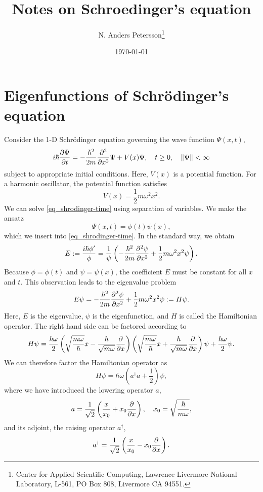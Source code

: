 \documentclass[11pt]{article}
\begin{document}
\title{Notes on Schroedinger's equation}

\author{N. Anders Petersson\thanks{Center for Applied
    Scientific Computing, Lawrence Livermore National Laboratory, L-561, PO Box 808, Livermore CA
    94551. }}

\date{\today}

\maketitle

\section{Eigenfunctions of Schr\"{o}dinger's equation}
 Consider the 1-D Schr\"odinger equation governing the wave function $\Psi(x,t)$,
\begin{equation}\label{eq_shrodinger-time}
i\hbar\frac{\partial \Psi}{\partial t} = -\frac{\hbar^2}{2 m} \frac{\partial^2}{\partial x^2} \Psi + V(x) \Psi,\quad t\geq
0,\quad \| \Psi \| < \infty
\end{equation}
subject to appropriate initial conditions. Here, $V(x)$ is a potential function. For a harmonic
oscillator, the potential function satisfies
\[
V(x) = \frac{1}{2}m\omega^2 x^2.
\]
We can solve \eqref{eq_shrodinger-time} using separation of variables. We make the ansatz
\[
\Psi(x,t) = \phi(t) \psi(x),
\]
which we insert into \eqref{eq_shrodinger-time}. In the standard way, we obtain
\[
E:= \frac{i\hbar \phi'}{\phi} = \frac{1}{\psi} \left(-\frac{\hbar^2}{2m} \frac{\partial^2\psi}{\partial x^2} +
\frac{1}{2} m \omega^2 x^2 \psi \right).
\]
Because $\phi=\phi(t)$ and $\psi=\psi(x)$, the coefficient $E$ must be constant for all $x$ and
$t$. This observation leads to the eigenvalue problem
\begin{equation}\label{eq_eigen-problem}
E\psi = -\frac{\hbar^2}{2m} \frac{\partial^2\psi}{\partial x^2} + \frac{1}{2} m \omega^2 x^2 \psi := H\psi.
\end{equation}
Here, $E$ is the eigenvalue, $\psi$ is the eigenfunction, and $H$ is called the Hamiltonian
operator. The right hand side can be factored according to
\[
H\psi = \frac{\hbar\omega}{2}
%
\left(\sqrt{\frac{m\omega}{\hbar}} x - \frac{\hbar}{\sqrt{m\omega}} \frac{\p}{\p x} \right)
%
\left(\sqrt{\frac{m \omega}{\hbar}} x + \frac{\hbar}{\sqrt{m\omega}} \frac{\p}{\p x} \right) \psi +
%
\frac{\hbar \omega}{2} \psi.
\]
We can therefore factor the Hamiltonian operator as
\begin{equation}\label{eq_ladder}
H\psi = \hbar\omega\left( a^\dag a + \frac{1}{2} \right)\psi,
\end{equation}
where we have introduced the lowering operator $a$,
\begin{equation}
  a = \frac{1}{\sqrt{2}} \left(\frac{x}{x_0} + x_0 \frac{\partial}{\partial x} \right),\quad x_0 = \sqrt{\frac{\hbar}{m\omega}},
\end{equation}
and its adjoint, the raising operator $a^\dag$,
\begin{equation}
  a^\dag= \frac{1}{\sqrt{2}} \left(\frac{x}{x_0} - x_0 \frac{\partial}{\partial x} \right).
\end{equation}
\end{document}
